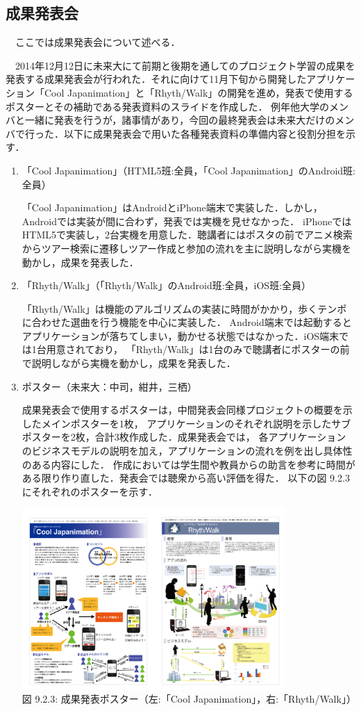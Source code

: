 \subsection{成果発表会}
\par
　ここでは成果発表会について述べる．
\par
 　2014年12月12日に未来大にて前期と後期を通してのプロジェクト学習の成果を発表する成果発表会が行われた．それに向けて11月下旬から開発したアプリケーション「Cool Japanimation」と「Rhyth/Walk」の開発を進め，発表で使用するポスターとその補助である発表資料のスライドを作成した．
例年他大学のメンバと一緒に発表を行うが，諸事情があり，今回の最終発表会は未来大だけのメンバで行った．以下に成果発表会で用いた各種発表資料の準備内容と役割分担を示す．
\begin{enumerate}
\item 「Cool Japanimation」（HTML5班:全員，「Cool Japanimation」のAndroid班:全員）
\par
 「Cool Japanimation」はAndroidとiPhone端末で実装した．しかし，Androidでは実装が間に合わず，発表では実機を見せなかった．
 iPhoneではHTML5で実装し，2台実機を用意した．聴講者にはポスタの前でアニメ検索からツアー検索に遷移しツアー作成と参加の流れを主に説明しながら実機を動かし，成果を発表した．
\par
\item 「Rhyth/Walk」（「Rhyth/Walk」のAndroid班:全員，iOS班:全員）
\par
 「Rhyth/Walk」は機能のアルゴリズムの実装に時間がかかり，歩くテンポに合わせた選曲を行う機能を中心に実装した．
 Android端末では起動するとアプリケーションが落ちてしまい，動かせる状態ではなかった．iOS端末では1台用意されており，
 「Rhyth/Walk」は1台のみで聴講者にポスターの前で説明しながら実機を動かし，成果を発表した．


\item ポスター（未来大：中司，紺井，三栖）
\par
 成果発表会で使用するポスターは，中間発表会同様プロジェクトの概要を示したメインポスターを1枚，
 アプリケーションのそれぞれ説明を示したサブポスターを2枚，合計3枚作成した．成果発表会では，
 各アプリケーションのビジネスモデルの説明を加え，アプリケーションの流れを例を出し具体性のある内容にした．
 作成においては学生間や教員からの助言を参考に時間がある限り作り直した．発表会では聴衆から高い評価を得た．
 以下の図 9.2.3にそれぞれのポスターを示す．
\begin{center}
\includegraphics[width=10cm, bb=0 0 200 150]{poster.png} \\
  図 9.2.3: 成果発表ポスター（左:「Cool Japanimation」，右:「Rhyth/Walk」）
\end{center}


\end{enumerate}
